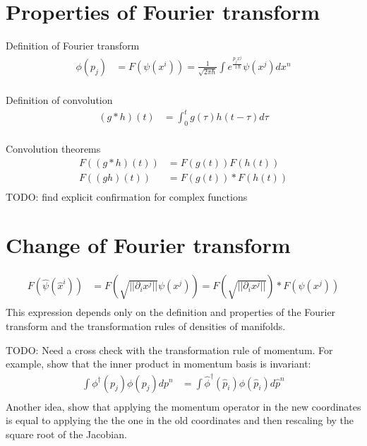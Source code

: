 \documentclass[11pt]{article}
\begin{document}
\section{Properties of Fourier transform}

Definition of Fourier transform
\begin{equation}
	\begin{aligned}
		\phi(p_j) &= F(\psi(x^i)) = \frac{1}{\sqrt{2 \pi \hbar}} \int e^{\frac{p_j x^j}{\imath \hbar}} \psi(x^j) dx^n \\
	\end{aligned}
\end{equation}

Definition of convolution
\begin{equation}
	\begin{aligned}
		(g * h)(t) &= \int_{0}^{t} g(\tau) h(t-\tau) d\tau\\
	\end{aligned}
\end{equation}

Convolution theorems
\begin{equation}
	\begin{aligned}
		F((g * h)(t)) &= F(g(t)) F(h(t))\\
		F((g h)(t)) &= F(g(t)) * F(h(t))\\
	\end{aligned}
\end{equation}
TODO: find explicit confirmation for complex functions

\section{Change of Fourier transform}
\begin{equation}
	\begin{aligned}
		F(\hat{\psi}(\hat{x}^i)) &= F\left(\sqrt{|| \partial_i x^j ||} \psi(x^j)\right) = F\left(\sqrt{|| \partial_i x^j ||}\right) * F \left( \psi(x^j)\right)  \\
	\end{aligned}
\end{equation}
This expression depends only on the definition and properties of the Fourier transform and the transformation rules of densities of manifolds.

TODO: Need a cross check with the transformation rule of momentum. For example, show that the inner product in momentum basis is invariant:
\begin{equation}
	\begin{aligned}
		\int \phi^\dagger(p_j) \phi(p_j) dp^n &= \int \hat{\phi}^\dagger(\hat{p}_i) \phi(\hat{p}_i) d\hat{p}^n  \\
	\end{aligned}
\end{equation}
Another idea, show that applying the momentum operator in the new coordinates is equal to applying the the one in the old coordinates and then rescaling by the square root of the Jacobian.
\end{document}
